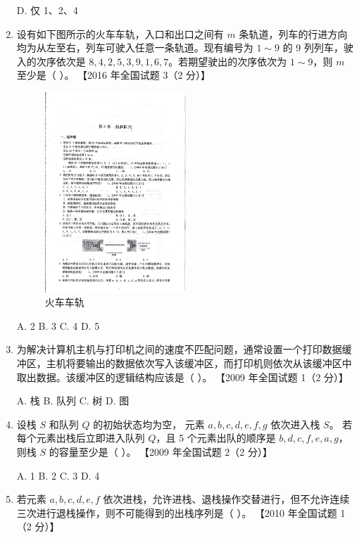 \documentclass[lang=cn,newtx,10pt,scheme=chinese]{../../elegantbook}
\begin{document}
\begin{enumerate}
    D. 仅 1、2、4  


    \item 设有如下图所示的火车车轨，入口和出口之间有 $m$ 条轨道，列车的行进方向均为从左至右，列车可驶入任意一条轨道。现有编号为 $1 \sim 9$ 的 9 列列车，驶入的次序依次是 $8, 4, 2, 5, 3, 9, 1, 6, 7$。若期望驶出的次序依次为 $1 \sim 9$，则 $m$ 至少是（ ）。  
    【2016 年全国试题 3（2 分）】  

    \begin{figure}[h!]
        \centering
        \includegraphics[width=0.5\textwidth]{../../figure/exercisePicPDF/chapter3/3-4.pdf}
        \caption{火车车轨}
        \label{fig:linear_list_2}
    \end{figure}
    A. 2 \quad B. 3 \quad C. 4 \quad D. 5  

    \item 为解决计算机主机与打印机之间的速度不匹配问题，通常设置一个打印数据缓冲区，主机将要输出的数据依次写入该缓冲区，而打印机则依次从该缓冲区中取出数据。该缓冲区的逻辑结构应该是（ ）。  
    【2009 年全国试题 1（2 分）】  
    
    A. 栈 \quad B. 队列 \quad C. 树 \quad D. 图  

    \item 设栈 $S$ 和队列 $Q$ 的初始状态均为空，
    元素 $a, b, c, d, e,f,g$ 依次进入栈 $S$。
    若每个元素出栈后立即进入队列 $Q$，且 5 个元素出队的顺序是 
    $b, d,c,f,e,a,g$，则栈 $S$ 的容量至少是（ ）。  
    【2009 年全国试题 2（2 分）】  
   
    A. 1 \quad B. 2 \quad C. 3 \quad D. 4  

    \item 若元素 $a, b, c, d, e,f$ 依次进栈，允许进栈、退栈操作交替进行，但不允许连续三次进行退栈操作，则不可能得到的出栈序列是（ ）。  
    【2010 年全国试题 1（2 分）】  


\end{enumerate}
\end{document}
